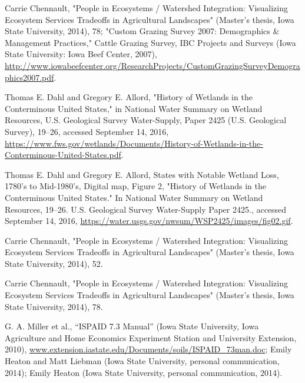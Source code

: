 \documentclass[11pt]{article}
\begin{document}
\begin{thebibliography}{1}
  Carrie Chennault, "People in Ecosystems / Watershed Integration: Visualizing Ecosystem Services Tradeoffs in Agricultural Landscapes" (Master’s thesis, Iowa State University, 2014), 78; "Custom Grazing Survey 2007: Demographics \& Management Practices," Cattle Grazing Survey, IBC Projects and Surveys (Iowa State University: Iowa Beef Center, 2007), \url{http://www.iowabeefcenter.org/ResearchProjects/CustomGrazingSurveyDemographics2007.pdf}.


  Thomas E. Dahl and Gregory E. Allord, "History of Wetlands in the Conterminous United States," in National Water Summary on Wetland Resources, U.S. Geological Survey Water-Supply, Paper 2425 (U.S. Geological Survey), 19–26, accessed September 14, 2016, \url{https://www.fws.gov/wetlands/Documents/History-of-Wetlands-in-the-Conterminous-United-States.pdf}.

  Thomas E. Dahl and Gregory E. Allord, States with Notable Wetland Loss, 1780’s to Mid-1980’s, Digital map, Figure 2, "History of Wetlands in the Conterminous United States." In National Water Summary on Wetland Resources, 19–26. U.S. Geological Survey Water-Supply Paper 2425., accessed September 14, 2016, \url{https://water.usgs.gov/nwsum/WSP2425/images/fig02.gif}.

  Carrie Chennault, "People in Ecosystems / Watershed Integration: Visualizing Ecosystem Services Tradeoffs in Agricultural Landscapes" (Master’s thesis, Iowa State University, 2014), 52.

  Carrie Chennault, "People in Ecosystems / Watershed Integration: Visualizing Ecosystem Services Tradeoffs in Agricultural Landscapes" (Master’s thesis, Iowa State University, 2014), 78.

    G. A. Miller et al., “ISPAID 7.3 Manual” (Iowa State University, Iowa Agriculture and Home Economics Experiment Station and University Extension, 2010), \url{www.extension.iastate.edu/Documents/soils/ISPAID_73man.doc}; Emily Heaton and Matt Liebman (Iowa State University, personal communication, 2014); Emily Heaton (Iowa State University, personal communication, 2014).
\end{thebibliography}
\end{document}
